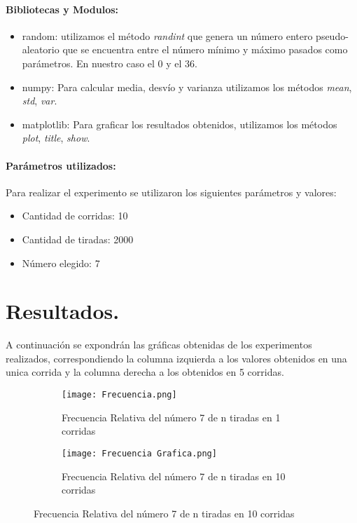 \documentclass{article}
\begin{document}
\paragraph{Bibliotecas y Modulos:}
\begin{itemize}
    \item random: utilizamos el método \textit{randint} que genera un número entero pseudo-aleatorio que se encuentra entre el número mínimo y máximo pasados como parámetros. En nuestro caso el 0 y el 36.
    \item numpy: Para calcular media, desvío y varianza utilizamos los métodos \textit{mean}, \textit{std}, \textit{var}.
    \item matplotlib: Para graficar los resultados obtenidos, utilizamos los métodos \textit{plot}, \textit{title}, \textit{show}.
\end{itemize}

\paragraph{Parámetros utilizados:}Para realizar el experimento se utilizaron los siguientes parámetros y valores:\begin{itemize}
    \item Cantidad de corridas: 10
    \item Cantidad de tiradas: 2000
    \item Número elegido: 7
\end{itemize}

\section{ Resultados.}
A continuación se expondrán las gráficas obtenidas de los experimentos realizados, correspondiendo la columna izquierda a los valores obtenidos en una unica corrida y la columna derecha a los obtenidos en 5 corridas.

    \begin{figure}[H]
    \centering
    \begin{subfigure}{0.45\linewidth}
    \texttt{[image: Frecuencia.png]}
    \caption{Frecuencia Relativa del número 7 de n tiradas en 1 corridas}
    \label{fig:grafico}
    \end{subfigure}
    \begin{subfigure}{0.45\linewidth}
    \centering
    \texttt{[image: Frecuencia Grafica.png]}
    \caption{Frecuencia Relativa del número 7 de n tiradas en 10 corridas}
    \label{fig:grafico}
    \end{subfigure}
    \end{figure}
\end{document}
